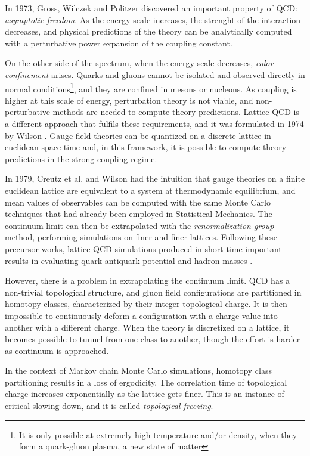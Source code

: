 In 1973, Gross, Wilczek \cite{gross-wilczek:1973} and Politzer \cite{politzer:1973} discovered an important property of QCD: \emph{asymptotic freedom}.
As the energy scale increases, the strenght of the interaction decreases,
and physical predictions of the theory can be analytically computed with a perturbative power expansion of the coupling constant.

On the other side of the spectrum, when the energy scale decreases, \emph{color confinement} arises.
Quarks and gluons cannot be isolated and observed directly in normal conditions\footnote{It is only possible at extremely high temperature and/or density, when they form a quark-gluon plasma, a new state of matter},
and they are confined in mesons or nucleons.
As coupling is higher at this scale of energy, perturbation theory is not viable, and non-perturbative methods are needed to compute theory predictions.
Lattice QCD is a different approach that fulfils these requirements, and it was formulated in 1974 by Wilson \cite{wilson:1974}.
Gauge field theories can be quantized on a discrete lattice in euclidean space-time and,
in this framework, it is possible to compute theory predictions in the strong coupling regime.

In 1979, Creutz et al.\@ \cite{creutz:1979} and Wilson \cite{wilson:1980}
had the intuition that gauge theories on a finite euclidean lattice are equivalent to a system at thermodynamic equilibrium,
and mean values of observables can be computed with the same Monte Carlo techniques that had already been employed in Statistical Mechanics.
The continuum limit can then be extrapolated with the \emph{renormalization group} method, performing simulations on finer and finer lattices.
Following these precursor works, lattice QCD simulations produced in short time important results in evaluating quark-antiquark potential and hadron masses
\cite{creutz:1980, hamber-parisi:1981, weingarten:1982}.

However, there is a problem in extrapolating the continuum limit.
QCD has a non-trivial topological structure, and gluon field configurations are partitioned in homotopy classes, characterized by their integer topological charge.
It is then impossible to continuously deform a configuration with a charge value into another with a different charge.
When the theory is discretized on a lattice, it becomes possible to tunnel from one class to another,
though the effort is harder as continuum is approached.

In the context of Markov chain Monte Carlo simulations, homotopy class partitioning results in a loss of ergodicity.
The correlation time of topological charge increases exponentially as the lattice gets finer.
This is an instance of critical slowing down, and it is called \emph{topological freezing}.

